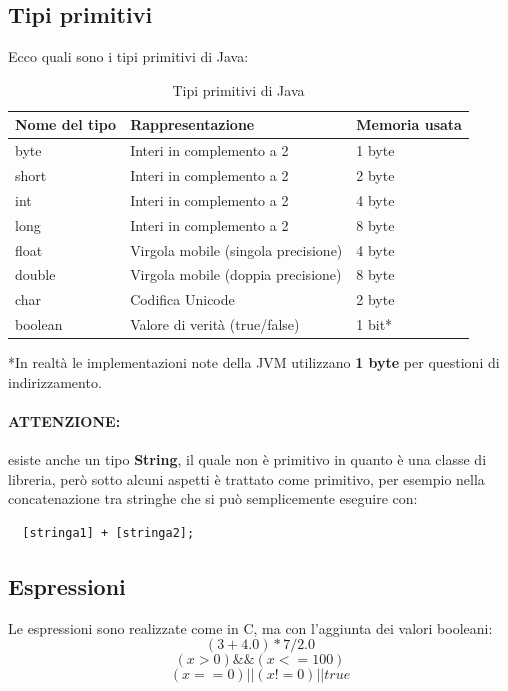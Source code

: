 \documentclass[12pt,a4paper]{article}
\begin{document}
\subsection{Tipi primitivi}
Ecco quali sono i tipi primitivi di Java:
\begin{table}[H]
    \centering
    \begin{tabular}{|l|l|l|}
        \hline
        \textbf{Nome del tipo} & \textbf{Rappresentazione} & \textbf{Memoria usata} \\
        \hline
        byte & Interi in complemento a 2 & 1 byte \\
        \hline
        short & Interi in complemento a 2 & 2 byte \\
        \hline
        int & Interi in complemento a 2 & 4 byte \\
        \hline
        long & Interi in complemento a 2 & 8 byte \\
        \hline
        float & Virgola mobile (singola precisione) & 4 byte \\
        \hline
        double & Virgola mobile (doppia precisione) & 8 byte \\
        \hline
        char & Codifica Unicode & 2 byte \\
        \hline
        boolean & Valore di verità (true/false) & 1 bit* \\
        \hline
    \end{tabular}
    \caption{Tipi primitivi di Java}
    \label{tab:tipi-java}
\end{table}
*In realtà le implementazioni note della JVM utilizzano \textbf{1 byte} per questioni di indirizzamento.\\
\paragraph{ATTENZIONE:} esiste anche un tipo \textbf{String}, il quale non è primitivo in quanto è una classe di libreria, però sotto alcuni aspetti è trattato come primitivo, per esempio nella concatenazione tra stringhe che si può semplicemente eseguire con:
\begin{lstlisting}
  [stringa1] + [stringa2];
\end{lstlisting}
\subsection{Espressioni}
Le espressioni sono realizzate come in C, ma con l'aggiunta dei valori booleani:
\[
(3+4.0) * 7 / 2.0
\]
\[
(x > 0) \&\& (x <= 100)
\]
\[
(x == 0) || (x != 0) || true
\]
\end{document}
